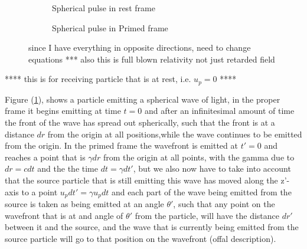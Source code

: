 \begin{figure}[ht]
\begin{subfigure}{.49\textwidth}
\caption{Spherical pulse in rest frame}
\end{subfigure}
\begin{subfigure}{.49\textwidth}
\caption{Spherical pulse in Primed frame}
\end{subfigure}
\caption{ since I have everything in opposite directions, need to change equations *** also this is full blown relativity not just retarded field }
\label{fig: Doppler effect appendix}
\end{figure}
**** this is for receiving particle that is at rest, i.e. $u_p=0$ ****

Figure (\ref{fig: Doppler effect appendix}), shows a particle emitting a spherical wave of light, in the proper frame it begins emitting at time $t=0$ and after an infinitesimal amount of time the front of the wave has spread out spherically, such that the front is at a distance $dr$ from the origin at all positions,while the wave continues to be emitted from the origin. In the primed frame the wavefront is emitted at $t'=0$ and reaches a point that is $\gamma dr$ from the origin at all points, with the gamma due to $dr=cdt$ and the the time $dt=\gamma dt'$, but we also now have to take into account that the source particle that is still emitting this wave has moved along the z'-axis to a point $u_p dt'= \gamma u_p dt$ and each part of the wave being emitted from the source is taken as being emitted at an angle $\theta'$, such that any point on the wavefront that is at and angle of $\theta'$ from the particle, will have the distance $dr'$ between it and the source, and the wave that is currently being emitted from the source particle will go to that position on the wavefront (offal description).


